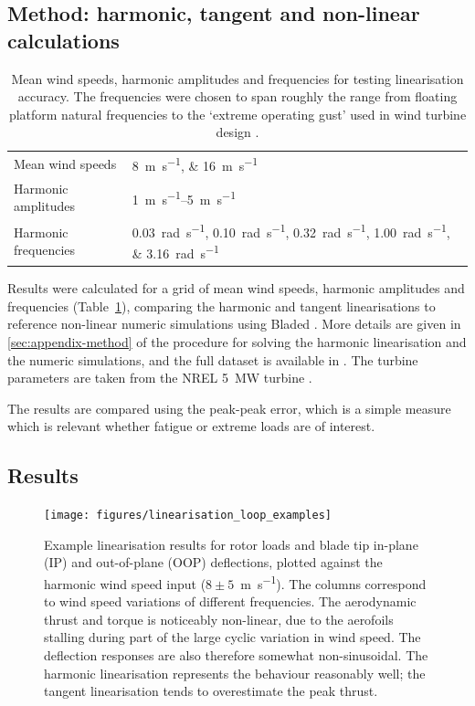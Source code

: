 \documentclass[a4paper,preprint]{elsarticle}
\begin{document}
\subsection{Method: harmonic, tangent and non-linear calculations}

\begin{table}
  \centering
  \caption{Mean wind speeds, harmonic amplitudes and frequencies for testing
    linearisation accuracy. The frequencies were chosen to span roughly the
    range from floating platform natural frequencies to the `extreme operating
    gust' used in wind turbine design \citep{IEC_ed3}.}
  \label{tab:test-grid}
  \begin{tabular}{ll}
    \toprule
    Mean wind speeds & \SIlist{8;16}{\meter\per\second} \\
    Harmonic amplitudes & \SIrange{1}{5}{\meter\per\second} \\
    Harmonic frequencies & \SIlist{0.03;0.10;0.32;1.00;3.16}{\radian\per\second} \\
    \bottomrule
  \end{tabular}
\end{table}

Results were calculated for a grid of mean wind speeds, harmonic amplitudes and
frequencies (Table~\ref{tab:test-grid}), comparing the harmonic and tangent
linearisations to reference non-linear numeric simulations using Bladed
\citep{GarradHassan2011}. More details are given in \ref{sec:appendix-method} of
the procedure for solving the harmonic linearisation and the numeric
simulations, and the full dataset is available in \cite{lupton_2018_1484513}.
The turbine parameters are taken from the NREL \SI{5}{\mega\watt} turbine
\citep{Jonkman2009b}.

The results are compared using the peak-peak error, which is a simple measure
which is relevant whether fatigue or extreme loads are of interest.

\subsection{Results}
\label{sec:aero-results}

\begin{figure}
  \centering
  \hspace*{-1.5cm}\texttt{[image: figures/linearisation\_loop\_examples]}
  \caption{Example linearisation results for rotor loads and blade tip in-plane
    (IP) and out-of-plane (OOP) deflections, plotted against the harmonic wind
    speed input ($8 \pm 5$~\si{\metre\per\second}). The columns correspond to
    wind speed variations of different frequencies. The aerodynamic thrust and
    torque is noticeably non-linear, due to the aerofoils stalling during part of
    the large cyclic variation in wind speed. The deflection responses are also
    therefore somewhat non-sinusoidal. The harmonic linearisation represents the
    behaviour reasonably well; the tangent linearisation tends to overestimate
    the peak thrust.}
\label{fig:hlin-example-loops}
\end{figure}
\end{document}

